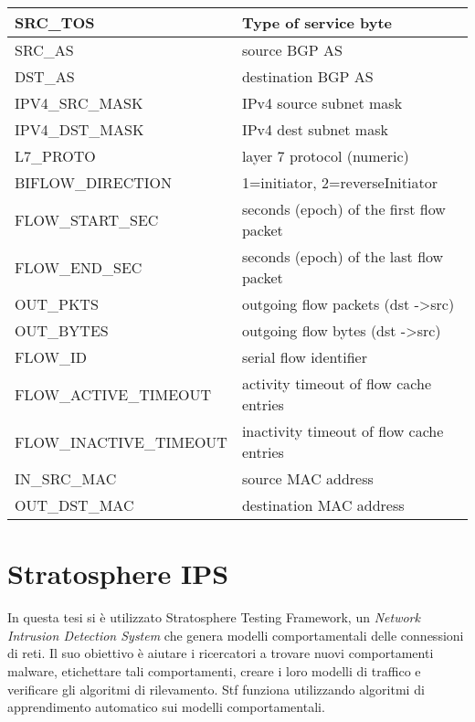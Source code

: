 \documentclass[../main.tex]{subfiles}
\begin{document}
\begin{table}[H]
\begin{tabular}{|l|l|}
SRC\_TOS                             & Type of service byte                          \\ \hline
SRC\_AS                              & source BGP AS                                 \\ \hline
DST\_AS                              & destination BGP AS                            \\ \hline
IPV4\_SRC\_MASK                      & IPv4 source subnet mask                       \\ \hline
IPV4\_DST\_MASK                      & IPv4 dest subnet mask                         \\ \hline
L7\_PROTO                            & layer 7 protocol (numeric)                    \\ \hline
BIFLOW\_DIRECTION                    & 1=initiator, 2=reverseInitiator               \\ \hline
FLOW\_START\_SEC                     & seconds (epoch) of the first flow packet      \\ \hline
FLOW\_END\_SEC                       & seconds (epoch) of the last flow packet       \\ \hline
OUT\_PKTS                            & outgoing flow packets (dst -\textgreater src) \\ \hline
OUT\_BYTES                           & outgoing flow bytes (dst -\textgreater src)   \\ \hline
FLOW\_ID                             & serial flow identifier                        \\ \hline
FLOW\_ACTIVE\_TIMEOUT                & activity timeout of flow cache entries        \\ \hline
FLOW\_INACTIVE\_TIMEOUT              & inactivity timeout of flow cache entries      \\ \hline
IN\_SRC\_MAC                         & source MAC address                            \\ \hline
OUT\_DST\_MAC                        & destination MAC address                       \\ \hline
\end{tabular}
\end{table}

\section{Stratosphere IPS}
In questa tesi si è utilizzato Stratosphere Testing Framework, un \textit{Network Intrusion Detection System} che genera modelli comportamentali delle connessioni di reti. Il suo obiettivo è aiutare i ricercatori a trovare nuovi comportamenti malware, etichettare tali comportamenti, creare i loro modelli di traffico e verificare gli algoritmi di rilevamento. Stf funziona utilizzando algoritmi di apprendimento automatico sui modelli comportamentali.
\end{document}
